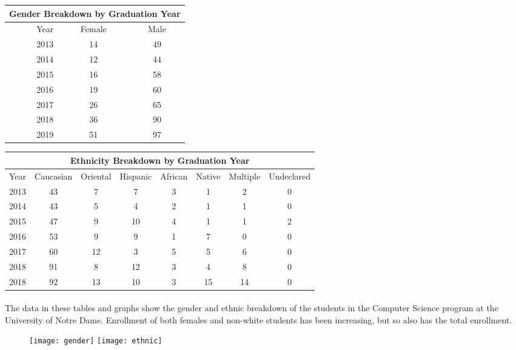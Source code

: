 \documentclass[letterpaper]{article}
\begin{document}
\begin{center}
\begin{tabular}{ |r|c|c| }
 \hline
 \multicolumn{3}{|c|}{Gender Breakdown by Graduation Year}\\
 \hline
 Year & Female & Male\\
 \hline
 2013  & 14 & 49\\
 2014  & 12 & 44\\
 2015  & 16 & 58\\
 2016  & 19 & 60\\
 2017  & 26 & 65\\
 2018  & 36 & 90\\
 2019  & 51 & 97\\
 \hline
\end{tabular}
\end{center}

\begin{center}
\begin{tabular}{ |r|c|c|c|c|c|c|c| }
 \hline
 \multicolumn{8}{|c|}{Ethnicity Breakdown by Graduation Year}\\
 \hline
 Year & Caucasian & Oriental & Hispanic & African & Native & Multiple & Undeclared\\
 \hline
 2013  & 43 & 7 & 7 & 3 & 1 & 2 & 0\\
 2014  & 43 & 5 & 4 & 2 & 1 & 1 & 0\\
 2015  & 47 & 9 & 10 & 4 & 1 & 1 & 2\\
 2016  & 53 & 9 & 9 & 1 & 7 & 0 & 0\\
 2017  & 60 & 12 & 3 & 5 & 5 & 6 & 0\\
 2018  & 91 & 8 & 12 & 3 & 4 & 8 & 0\\
 2018  & 92 & 13 & 10 & 3 & 15 & 14 & 0\\
 \hline
\end{tabular}
\end{center}


\paragraph{}

The data in these tables and graphs show the gender and ethnic breakdown of the students in the Computer Science program at the University of Notre Dame. Enrollment of both females and non-white students has been increasing, but so also has the total enrollment.


\begin{figure}[t]
\centering
\texttt{[image: gender]}
\texttt{[image: ethnic]}
\end{figure}
\end{document}

